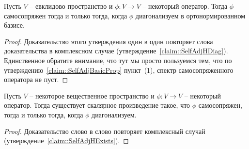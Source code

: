 \begin{claim}
\label{claim::SelfAdjEDiag}
Пусть $V$ -- евклидово пространство и $\phi\colon V\to V$ -- некоторый оператор.
Тогда $\phi$ самосопряжен тогда и только тогда, когда $\phi$ диагонализуем в ортонормированном базисе.
\end{claim}
\begin{proof}
Доказательство этого утверждения один в один повторяет слова доказательства в комплексном случае (утверждение~\ref{claim::SelfAdjHDiag}).
Единственное обратите внимание, что тут мы просто пользуемся тем, что по утверждению~\ref{claim::SelfAdjBasicProp} пункт~(1), спектр самосопряженного оператора не пуст.
\end{proof}

\begin{claim}
Пусть $V$ -- некоторое вещественное пространство и $\phi\colon V\to V$ -- некоторый оператор.
Тогда существует скалярное произведение такое, что $\phi$ самосопряжен, тогда и только тогда, когда $\phi$ диагонализуем.
\end{claim}
\begin{proof}
Доказательство слово в слово повторяет комплексный случай (утверждение~\ref{claim::SelfAdjHExists}).
\end{proof}
